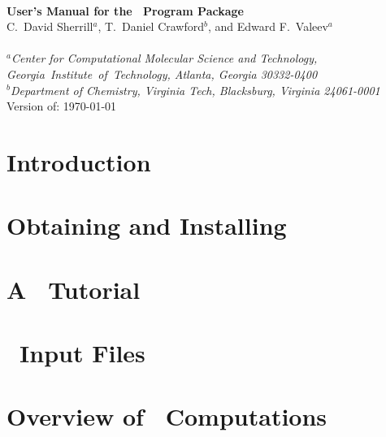 \documentclass[12pt]{article}
\begin{document}


\begin{center}
\ \\
\vspace{2.0in}
{\bf {\Large User's Manual for the \PSIthree\ Program Package}} \\
\vspace{0.5in}
C.\ David Sherrill$^a$, T.\ Daniel Crawford$^b$, and Edward F.\ Valeev$^a$\\
\ \\
{\em $^a$Center for Computational Molecular Science and Technology, \mbox{Georgia 
Institute of Technology,} Atlanta, Georgia 30332-0400} \\
\vspace{0.1in}
{\em $^b$Department of Chemistry, Virginia Tech, Blacksburg, Virginia 24061-0001}
\ \\
\vspace{0.3in}
Version of: \today
\end{center}

\thispagestyle{empty}

\newpage
\newpage

\section{Introduction} \label{introduction}
%

\section{Obtaining and Installing \PSIthree} \label{installation}


\section{A \PSIthree\ Tutorial} \label{tutorial}
%

\section{\PSIthree\ Input Files} \label{input}


\section{Overview of \PSIthree\ Computations} \label{overview}
\end{document}
